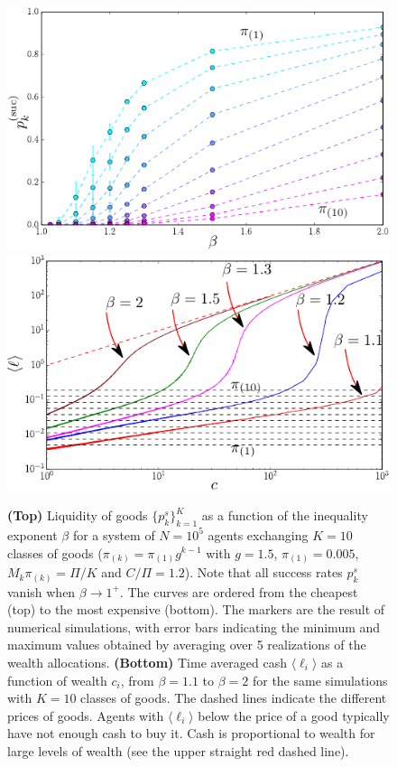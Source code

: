 \begin{figure}
\includegraphics[width=\textwidth]{figs_ineq/cropping-K=10_e=1p2_g=1p5_ps_prediction_adjustedcapital-crop.pdf} \\

\includegraphics[width=\textwidth]{figs_ineq/cropping-liquidity_global-crop.pdf}
\caption{\textbf{(Top)} Liquidity of goods $\{p^s_k\}_{k=1}^K$  as a function of the inequality exponent $\beta$ for a system of $N=10^5$ agents exchanging $K=10$ classes of goods ($\pi_{(k)}=\pi_{(1)}g^{k-1}$ with $g=1.5$, $\pi_{(1)}=0.005$, $M_k\pi_{(k)}=\Pi/K$ and $C/\Pi=1.2$). Note that all success rates $p^s_k$  vanish when $\beta \to 1^+$.  The curves are ordered from the cheapest (top) to the most expensive (bottom). The markers are the result of numerical simulations, with error bars indicating the minimum and maximum values obtained by averaging over 5 realizations of the wealth allocations. \textbf{(Bottom)} Time averaged cash $\langle \ell_i \rangle$ as a function of wealth $c_i$, from $\beta= 1.1$ to $\beta =2$ for the same simulations with $K=10$ classes of goods. The dashed lines indicate the different prices of goods. Agents with $\langle \ell_i \rangle$ below the price of a good typically have not enough cash to buy it. Cash is proportional to wealth for large levels of wealth (see the upper straight red dashed line). 
}
\label{Fig:K10_ps_beta}
\end{figure}

